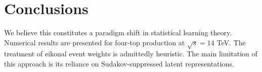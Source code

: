 \section{Conclusions}\label{sec:conclusions}

We believe this constitutes a paradigm shift in statistical learning
theory. Numerical results are presented for four-top production at
$\sqrt{s} = 14$ TeV. The treatment of eikonal event weights is
admittedly heuristic. The main limitation of this approach is its
reliance on Sudakov-suppressed latent representations.

